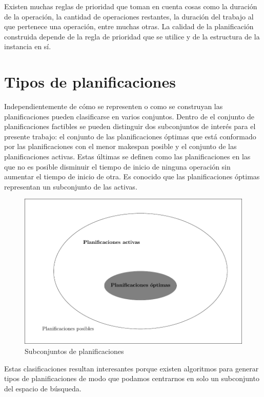 Existen muchas reglas de prioridad que toman en cuenta cosas como la duración de la operación, la cantidad de operaciones restantes, la duración del trabajo al que pertenece una operación, entre muchas otras. La calidad de la planificación construida depende de la regla de prioridad que se utilice y de la estructura de la instancia en sí.


\section{Tipos de planificaciones}
Independientemente de cómo se representen o como se construyan las planificaciones pueden clasificarse en varios conjuntos. Dentro de el conjunto de planificaciones factibles se pueden distinguir dos subconjuntos de interés para el presente trabajo: el conjunto de las planificaciones óptimas que está conformado por las planificaciones con el menor makespan posible y el conjunto de las planificaciones activas. 
Estas últimas se definen como las planificaciones en las que no es posible disminuir el tiempo de inicio de ninguna operación sin aumentar el tiempo de inicio de otra. Es conocido que las planificaciones óptimas representan un subconjunto de las activas\cite{Ponsich2013}.


\begin{figure}[H]
    \centering
    \includegraphics[scale=.8]{Imagenes/solspace.pdf}
    \caption{Subconjuntos de planificaciones}
\end{figure}

Estas clasificaciones resultan interesantes porque existen algoritmos para generar tipos de planificaciones de modo que podamos centrarnos en solo un subconjunto del espacio de búsqueda.
